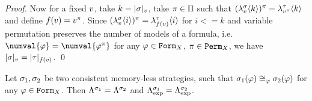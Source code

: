 \begin{proof}
Now for a fixed $v$, take $k = |\sigma|_{v}$, take
  $\pi\in\Pi$ such that
  $(\lambda^{\sigma}_{v}\langle k\rangle)^\pi = \lambda^{\tau}_{v^\pi}\langle k\rangle$
  and define $f(v) = v^\pi$.
Since
 $(\lambda^{\sigma}_{v}\langle i\rangle)^\pi = \lambda^{\tau}_{f(v)}\langle i\rangle$
 for $i <= k$
 and variable permutation preserves the number of models of a formula, i.e.
  $\numval{\form} = \numval{\form^\perm}$ for any
  $\varphi\in\mathtt{Form}_X$, $\pi\in\mathtt{Perm}_X$,
 we have
  $|\sigma|_{v} = |\tau|_{f(v)}$.
  \qed
\end{proof}

\begin{corollary}
Let $\sigma_1, \sigma_2$ be two consistent memory-less strategies, such that
  $\sigma_1(\varphi) \cong_{\varphi} \sigma_2(\varphi)$ for any $\varphi\in\mathtt{Form}_X$.
Then $\Lambda^{\sigma_1} = \Lambda^{\sigma_2}$
  and $\Lambda^{\sigma_1}_\textrm{exp} = \Lambda^{\sigma_2}_\textrm{exp}$.
\end{corollary}





